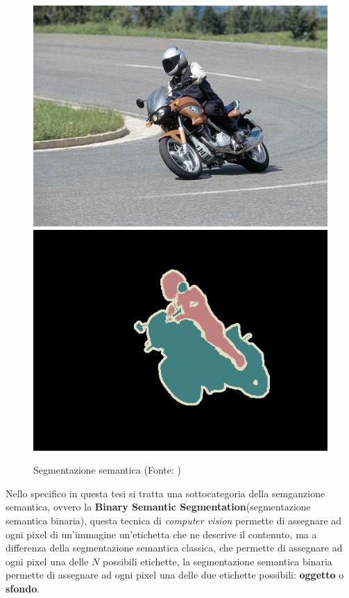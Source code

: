 \begin{figure}[!ht]
	\begin{adjustbox}{width=0.8\columnwidth, center}
		\includegraphics{./images/segmantion_example_image.png}
    \hspace{20pt} %
    \includegraphics{./images/segmantion_example_mask.png}
	\end{adjustbox}
	\caption{Segmentazione semantica (Fonte: \cite{pascal-voc-2012})}
	\label{fig:segmantion_example}
\end{figure}

Nello specifico in questa tesi si tratta una sottocategoria della semganzione semantica,
ovvero la \textbf{Binary Semantic Segmentation}(segmentazione semantica
binaria), questa tecnica di \textit{computer vision} permette di assegnare ad ogni pixel
di un'immagine un'etichetta che ne descrive il contenuto, ma a differenza della
segmentazione semantica classica, che permette di assegnare ad ogni pixel una delle $N$
possibili etichette, la segmentazione semantica binaria permette di assegnare ad ogni
pixel una delle due etichette possibili: \textbf{oggetto} o \textbf{sfondo}.

